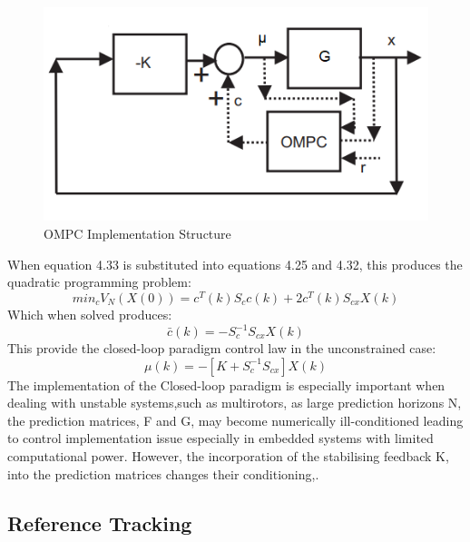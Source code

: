 \documentclass[12pt,a4paper,twoside]{report}
\begin{document}
				\begin{figure}[h!]
					\centering
					\includegraphics[width=0.8\linewidth]{OMPC.png}
					\caption{OMPC Implementation Structure}
					\label{fig:ompcimplementationstructure}
				\end{figure}
			
				When equation 4.33 is substituted into equations 4.25 and 4.32, this produces the quadratic programming problem:
				\begin{equation}
					min_c V_N(X(0)) = c^{T}(k) S_c c(k) + 2 c^{T}(k) S_{cx}X(k)
				\end{equation}
				Which when solved produces:
				\begin{equation}
					\bar{c}(k) = - S_c^{-1}S_{cx}X(k)
				\end{equation}
				This provide the closed-loop paradigm control law in the unconstrained case:
				\begin{equation}
					\mu(k) = - [K + S_c^{-1}S_{cx}]X(k)
				\end{equation}
				The implementation of the Closed-loop paradigm is especially important when dealing with unstable systems,such as multirotors, as large prediction horizons N, the prediction matrices, F and G, may become numerically ill-conditioned leading to control implementation issue especially in embedded systems with limited computational power. However, the incorporation of the stabilising feedback K, into the prediction matrices changes their conditioning\cite{26},\cite{27}.
				
			\subsection{Reference Tracking}
				
\end{document}

